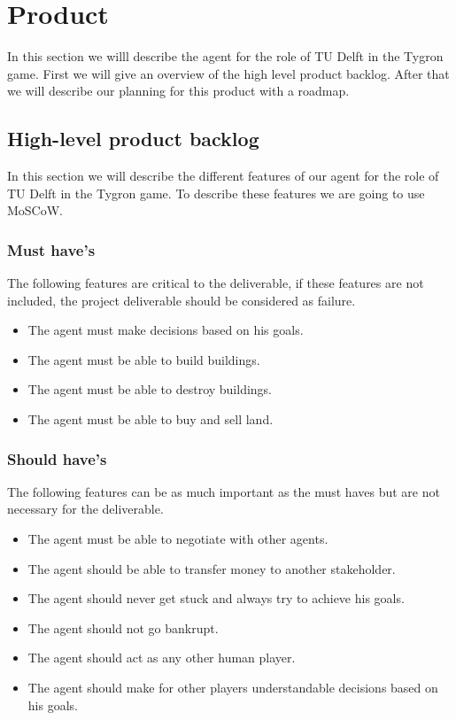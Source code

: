 \section{Product}

In this section we willl describe the agent for the role of TU Delft in the Tygron game. First we will give an overview of the high level product backlog. After that we will describe our planning for this product with a roadmap.

\subsection{High-level product backlog}
In this section we will describe the different features of our agent for the role of TU Delft in the Tygron game. To describe these features we are going to use MoSCoW.

\subsubsection{Must have's}
The following features are critical to the deliverable, if these features are not included, the project deliverable should be considered as failure.
\begin{itemize}
	\item The agent must make decisions based on his goals.
	\item The agent must be able to build buildings.
	\item The agent must be able to destroy buildings.
	\item The agent must be able to buy and sell land.

\end{itemize}

\subsubsection{Should have's}
The following features can be as much important as the must haves but are not necessary for the deliverable.
\begin{itemize}
	\item  The agent must be able to negotiate with other agents.
	\item  The agent should be able to transfer money to another stakeholder.
	\item The agent should never get stuck and always try to achieve his goals.
	\item The agent should not go bankrupt.
	\item The agent should act as any other human player.
	\item The agent should make for other players understandable decisions based on his goals.
\end{itemize}

